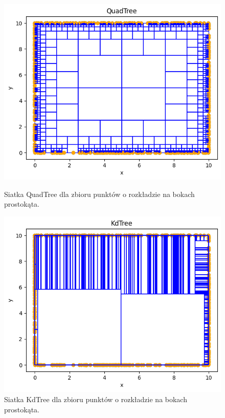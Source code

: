 \documentclass{lab}
\begin{document}
\begin{figure}[H]
  \centering
  \begin{minipage}{0.495\textwidth}
      \centering
      \includegraphics[width=1\textwidth]{resources/rectangle_QuadTree.png}
      \caption{Siatka QuadTree dla zbioru punktów o rozkładzie na bokach prostokąta.}
      \label{fig:rectangle_QuadTree}
  \end{minipage}
  \begin{minipage}{0.495\textwidth}
      \centering
      \includegraphics[width=1\textwidth]{resources/rectangle_KdTree.png}
      \caption{Siatka KdTree dla zbioru punktów o rozkładzie na bokach prostokąta.}
      \label{fig:rectangle_KdTree}
  \end{minipage}
\end{figure}
\end{document}
